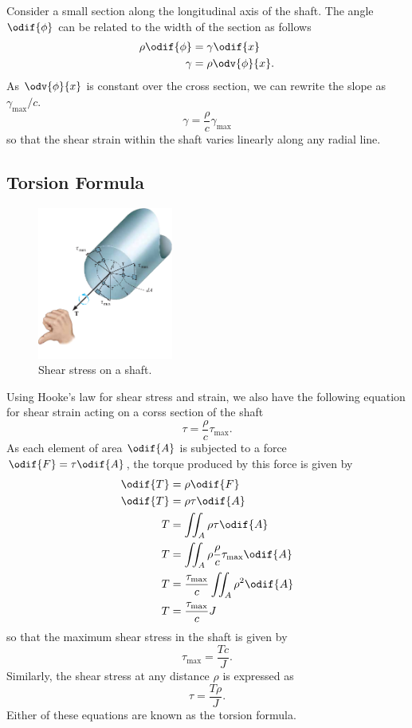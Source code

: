 \documentclass{article}
\begin{document}
Consider a small section along the longitudinal axis of the shaft. The angle \(\odif{\phi}\)
can be related to the width of the section as follows
\begin{align*}
    \rho \odif{\phi} & = \gamma \odif{x}     \\
    \gamma           & = \rho \odv{\phi}{x}.
\end{align*}
As \(\odv{\phi}{x}\) is constant over the cross section, we can rewrite the slope as \(\gamma_{\text{max}} / c\).
\begin{equation*}
    \gamma = \frac{\rho}{c} \gamma_{\text{max}}
\end{equation*}
so that the shear strain within the shaft varies linearly along any radial line.
\subsection{Torsion Formula}
\begin{figure}[H]
    \centering
    \includegraphics[height = 5cm, keepaspectratio = true]{figures/shaft_shear_stress.pdf}
    \caption{Shear stress on a shaft.} %
\end{figure}
Using Hooke's law for shear stress and strain, we also have the following equation for
shear strain acting on a corss section of the shaft
\begin{equation*}
    \tau = \frac{\rho}{c} \tau_{\text{max}}.
\end{equation*}
As each element of area \(\odif{A}\) is subjected to a force \(\odif{F} = \tau \odif{A}\), the
torque produced by this force is given by
\begin{align*}
    \odif{T} & = \rho \odif{F}                                          \\
    \odif{T} & = \rho \tau \odif{A}                                     \\
    T        & = \iint_A \rho \tau \odif{A}                             \\
    T        & = \iint_A \rho \frac{\rho}{c} \tau_{\text{max}} \odif{A} \\
    T        & = \frac{\tau_{\text{max}}}{c} \iint_A \rho^2 \odif{A}    \\
    T        & = \frac{\tau_{\text{max}}}{c} J
\end{align*}
so that the maximum shear stress in the shaft is given by
\begin{equation*}
    \tau_{\text{max}} = \frac{Tc}{J}.
\end{equation*}
Similarly, the shear stress at any distance \(\rho\) is expressed as
\begin{equation*}
    \tau = \frac{T\rho}{J}.
\end{equation*}
Either of these equations are known as the torsion formula.
\end{document}
